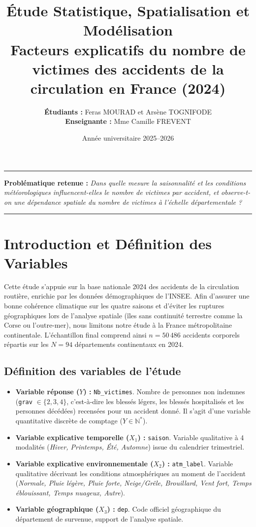 \documentclass[11pt,a4paper]{article}
\title{\textbf{\LARGE Étude Statistique, Spatialisation et Modélisation}\\[0.5em]
\Large Facteurs explicatifs du nombre de victimes des accidents de la circulation en France (2024)\\[0.3em]}
\author{\textbf{Étudiants : } Feras MOURAD et Arsène TOGNIFODE \\
\textbf{Enseignante : } Mme Camille FREVENT}
\date{Année universitaire 2025--2026}
\begin{document}
\maketitle

\hrule
\vspace{1em}
\noindent\textbf{Problématique retenue : } 
\textit{\og Dans quelle mesure la saisonnalité et les conditions météorologiques influencent-elles le nombre de victimes par accident, et observe-t-on une dépendance spatiale du nombre de victimes à l'échelle départementale ?\fg{}}
\vspace{1em}
\hrule

\vspace{1.5em}

\section{Introduction et Définition des Variables}

Cette étude s'appuie sur la base nationale 2024 des accidents de la circulation routière, enrichie par les données démographiques de l'INSEE. Afin d'assurer une bonne cohérence climatique sur les quatre saisons et d'éviter les ruptures géographiques lors de l'analyse spatiale (îles sans continuité terrestre comme la Corse ou l'outre-mer), nous limitons notre étude à la France métropolitaine continentale. L'échantillon final comprend ainsi $n = 50\,486$ accidents corporels répartis sur les $N = 94$ départements continentaux en 2024.

\subsection{Définition des variables de l'étude}
\begin{itemize}
    \item \textbf{Variable réponse ($Y$) :} \texttt{Nb\_victimes}. Nombre de personnes non indemnes (\texttt{grav} $\in \{2, 3, 4\}$, c'est-à-dire les blessés légers, les blessés hospitalisés et les personnes décédées) recensées pour un accident donné. Il s'agit d'une variable quantitative discrète de comptage ($Y \in \mathbb{N}^*$).
    \item \textbf{Variable explicative temporelle ($X_1$) :} \texttt{saison}. Variable qualitative à 4 modalités (\textit{Hiver, Printemps, Été, Automne}) issue du calendrier trimestriel.
    \item \textbf{Variable explicative environnementale ($X_2$) :} \texttt{atm\_label}. Variable qualitative décrivant les conditions atmosphériques au moment de l'accident (\textit{Normale, Pluie légère, Pluie forte, Neige/Grêle, Brouillard, Vent fort, Temps éblouissant, Temps nuageux, Autre}).
    \item \textbf{Variable géographique ($X_3$) :} \texttt{dep}. Code officiel géographique du département de survenue, support de l'analyse spatiale.
\end{itemize}
\end{document}

